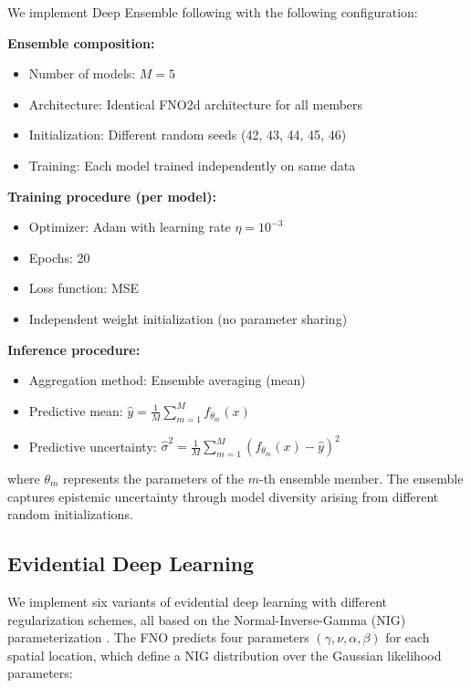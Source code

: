 We implement Deep Ensemble following \cite{lakshminarayanan2017simple} with the following configuration:

\textbf{Ensemble composition:}
\begin{itemize}
\item Number of models: $M = 5$
\item Architecture: Identical FNO2d architecture for all members
\item Initialization: Different random seeds (42, 43, 44, 45, 46)
\item Training: Each model trained independently on same data
\end{itemize}

\textbf{Training procedure (per model):}
\begin{itemize}
\item Optimizer: Adam with learning rate $\eta = 10^{-3}$
\item Epochs: 20
\item Loss function: MSE
\item Independent weight initialization (no parameter sharing)
\end{itemize}

\textbf{Inference procedure:}
\begin{itemize}
\item Aggregation method: Ensemble averaging (mean)
\item Predictive mean: $\hat{y} = \frac{1}{M}\sum_{m=1}^{M} f_{\theta_m}(x)$
\item Predictive uncertainty: $\hat{\sigma}^2 = \frac{1}{M}\sum_{m=1}^{M} (f_{\theta_m}(x) - \hat{y})^2$
\end{itemize}

where $\theta_m$ represents the parameters of the $m$-th ensemble member. The ensemble captures epistemic uncertainty through model diversity arising from different random initializations.

\subsection{Evidential Deep Learning}

We implement six variants of evidential deep learning with different regularization schemes, all based on the Normal-Inverse-Gamma (NIG) parameterization \cite{murphy2012machine}. The FNO predicts four parameters $(\gamma, \nu, \alpha, \beta)$ for each spatial location, which define a NIG distribution over the Gaussian likelihood parameters:

